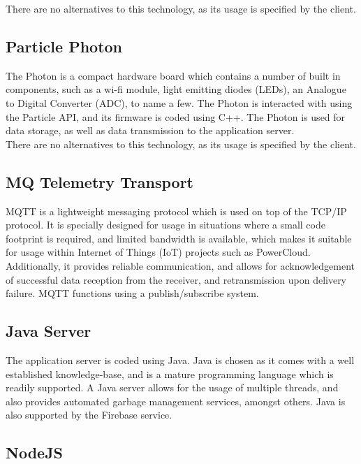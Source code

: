 \documentclass{article}
\begin{document}
	\noindent
	There are no alternatives to this technology, as its usage is 
	specified by the client.
	
	\subsection{Particle Photon}
	
	The Photon is a compact hardware board which contains a number of 
	built in components, such as a wi-fi module, light emitting diodes 
	(LEDs), an Analogue to Digital Converter (ADC), to name a few. The 
	Photon is interacted with using the Particle API, and its firmware is 
	coded using C++. The Photon is used for data storage, as well as data 
	transmission to the application server.\\
	
	\noindent
	There are no alternatives to this technology, as its usage is 
	specified by the client.
	
	\subsection{MQ Telemetry Transport}
	
	MQTT is a lightweight messaging protocol which is used on top of the 
	TCP/IP protocol. It is specially designed for usage in situations 
	where a small code footprint is required, and limited bandwidth is 
	available, which makes it suitable for usage within Internet of 
	Things (IoT) projects such as PowerCloud. Additionally, it provides 
	reliable communication, and allows for acknowledgement of successful 
	data reception from the receiver, and retransmission upon delivery 
	failure. MQTT functions using a publish/subscribe system.
	
	\subsection{Java Server}
	
	The application server is coded using Java. Java is chosen as it 
	comes with a well established knowledge-base, and is a mature 
	programming language which is readily supported. A Java server allows 
	for the usage of multiple threads, and also provides automated 
	garbage management services, amongst others. Java is also supported 
	by the Firebase service.
	
	\subsection{NodeJS}
	
\end{document}
